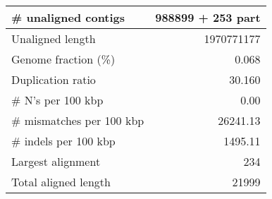 \documentclass[12pt,a4paper]{article}
\begin{document}
\begin{table}[ht]
\begin{center}
\begin{tabular}{|l*{1}{|r}|}
\# unaligned contigs & 988899 + 253 part \\ \hline
Unaligned length & 1970771177 \\ \hline
Genome fraction (\%) & 0.068 \\ \hline
Duplication ratio & 30.160 \\ \hline
\# N's per 100 kbp & 0.00 \\ \hline
\# mismatches per 100 kbp & 26241.13 \\ \hline
\# indels per 100 kbp & 1495.11 \\ \hline
Largest alignment & 234 \\ \hline
Total aligned length & 21999 \\ \hline
\end{tabular}
\end{center}
\end{table}
\end{document}
